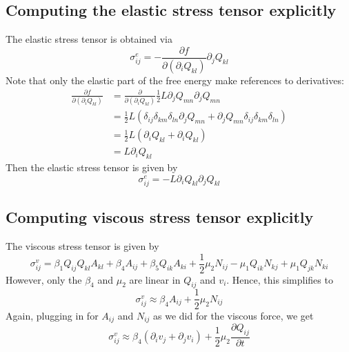 \documentclass[reqno]{article}
\begin{document}
	\subsection{Computing the elastic stress tensor explicitly}
	The elastic stress tensor is obtained via
	\begin{equation}
		\sigma^{e}_{ij} = -\frac{\partial f}{\partial (\partial_i Q_{kl})} \partial_j Q_{kl}
	\end{equation}
	Note that only the elastic part of the free energy make references to derivatives:
	\begin{equation}
	\begin{split}
		\frac{\partial f}{\partial (\partial_i Q_{kl})} &= \frac{\partial}{\partial (\partial_i Q_{kl})} \frac{1}{2} L \partial_j Q_{mn} \partial_j Q_{mn} \\
		&= \frac{1}{2} L (\delta_{ij}\delta_{km}\delta_{ln} \partial_j Q_{mn} + \partial_j Q_{mn} \delta_{ij}\delta_{km}\delta_{ln}) \\
		&= \frac{1}{2} L (\partial_i Q_{kl} + \partial_i Q_{kl}) \\
		&= L\partial_i Q_{kl}
	\end{split}
	\end{equation}
	Then the elastic stress tensor is given by
	\begin{equation}
		\sigma^e_{ij} = -L\partial_i Q_{kl} \partial_j Q_{kl}
	\end{equation}
	
	\subsection{Computing viscous stress tensor explicitly}
	The viscous stress tensor is given by
	\begin{equation}
		\sigma^v_{ij} = \beta_1 Q_{ij}Q_{kl}A_{kl} + \beta_4 A_{ij} + \beta_5 Q_{ik} A_{ki} + \frac{1}{2} \mu_2 N_{ij} - \mu_1 Q_{ik}N_{kj} + \mu_1 Q_{jk}N_{ki}
	\end{equation}
	However, only the $\beta_4$ and $\mu_2$ are linear in $Q_{ij}$ and $v_i$. Hence, this simplifies to
	\begin{equation}
		\sigma^v_{ij} \approx \beta_4 A_{ij} + \frac{1}{2} \mu_2 N_{ij}
	\end{equation}
	Again, plugging in for $A_{ij}$ and $N_{ij}$ as we did for the viscous force, we get
	\begin{equation}
		\sigma^v_{ij} \approx \beta_4 (\partial_i v_j + \partial_j v_i) + \frac{1}{2} \mu_2  \frac{\partial Q_{ij}}{\partial t}
	\end{equation}
	
\end{document}
